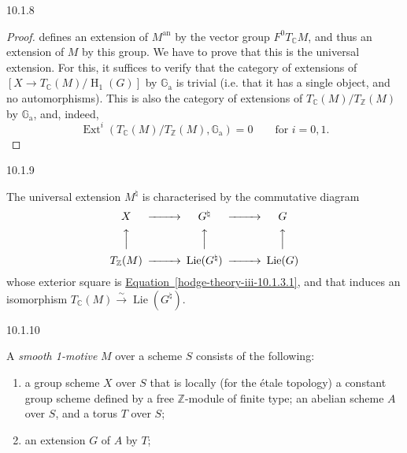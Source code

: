 \begin{construction}{10.1.8}
\begin{proof}
      defines an extension of \(M^\mathrm {an}\) by the vector group \(F^0T_\mathbb {C} M\), and thus an extension of \(M\) by this group.
      We have to prove that this is the universal extension.
      For this, it suffices to verify that the category of extensions of \([X\to  T_\mathbb {C}(M)/\operatorname {H}_1(G)]\) by \(\mathbb {G}_\mathrm {a}\) is trivial (i.e. that it has a single object, and no automorphisms).
      This is also the category of extensions of \(T_\mathbb {C}(M)/T_\mathbb {Z}(M)\) by \(\mathbb {G}_\mathrm {a}\), and, indeed,
      \[         \operatorname {Ext}^i(T_\mathbb {C}(M)/T_\mathbb {Z}(M),\mathbb {G}_\mathrm {a})         = 0         \qquad \text {for }i=0,1.       \]\end{proof}\end{construction}\begin{remark}{10.1.9}\label{hodge-theory-iii-10.1.9}\skipsinglepar\par{}The universal extension \(M^\natural \) is characterised by the commutative diagram
    \[       \begin {CD}         X @>>> G^\natural  @>>> G       \\@AAA @AAA @AAA       \\T_\mathbb {Z}(M) @>>> \operatorname {Lie}(G^\natural ) @>>> \operatorname {Lie}(G)       \end {CD}     \]
    whose exterior square is \hyperref[hodge-theory-iii-10.1.3.1]{Equation~\ref*{hodge-theory-iii-10.1.3.1}}, and that induces an isomorphism \(T_\mathbb {C}(M)\xrightarrow {\sim }\operatorname {Lie}(G^\natural )\).\end{remark}\begin{variant}{10.1.10}\label{hodge-theory-iii-10.1.10}\skipsinglepar\par{}A \emph{smooth 1-motive} \(M\) over a scheme \(S\) consists of the following:

    
 \begin{enumerate}
      
 \item[(a)]
        a group scheme \(X\) over \(S\) that is locally (for the étale topology) a constant group scheme defined by a free \(\mathbb {Z}\)-module of finite type;
        an abelian scheme \(A\) over \(S\), and a torus \(T\) over \(S\);
      

      
 \item[(b)]
        an extension \(G\) of \(A\) by \(T\);
      


\end{enumerate}
\end{variant}

